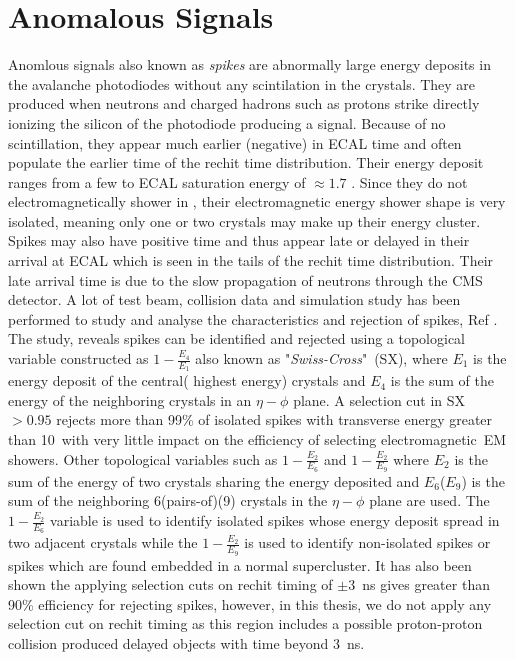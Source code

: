 \section{Anomalous Signals}
Anomlous signals also known as \textit{spikes} are abnormally large energy deposits in the avalanche photodiodes without any scintilation in the \pb crystals. They are produced when neutrons and charged hadrons such as protons strike directly ionizing the silicon of the photodiode  producing a signal.
Because of no scintillation, they appear much earlier (negative) in ECAL time and often populate the earlier time of the rechit time distribution. Their energy deposit ranges from a few \GeV to ECAL saturation energy of $\approx 1.7$ \TeV. Since they do not electromagnetically shower in \pb, their electromagnetic energy shower shape is  very isolated, meaning only one or two crystals may make up their energy cluster. Spikes may also have positive time and thus appear late or delayed in their arrival at ECAL which is seen in the tails of the rechit time distribution. Their late arrival time is due to the slow propagation of neutrons through the CMS detector. A lot of test beam, collision data and simulation study has been performed to study and analyse the characteristics and rejection of spikes, Ref \cite{spike}. The study, reveals spikes can be identified and rejected using a topological variable constructed as $1 - \frac{E_{4}}{E_{1}}$ also known as "\textit{Swiss-Cross}"~(SX), where $E_{1}$ is the energy deposit of the central( highest energy) crystals and $E_{4}$ is the sum of the energy of the neighboring crystals in an $\eta - \phi $ plane. A selection cut in SX $ > 0.95$ rejects more than 99\% of isolated spikes with transverse energy greater than 10~\GeV with very little impact on the efficiency of selecting electromagnetic~{EM} showers.
Other topological variables such as $ 1 - \frac{E_{2}}{E_{6}}$ and $ 1 - \frac{E_{2}}{E_{9}} $ where $E_{2}$ is the sum of the energy of two  crystals sharing the energy deposited and $E_{6}$($E_{9}$) is the sum of the neighboring 6(pairs-of)(9) crystals in the $\eta - \phi$ plane are used. The $ 1 - \frac{E_{2}}{E_{6}} $ variable is used to identify isolated spikes whose energy deposit spread in two adjacent crystals while the  $ 1 - \frac{E_{2}}{E_{9}} $ is used to identify  non-isolated spikes or spikes which are found embedded in a normal supercluster.
It has also been shown the applying selection cuts on rechit timing of $ \pm 3$~ns gives greater than 90\% efficiency for rejecting spikes, however, in this thesis, we do not apply any selection cut on rechit timing  as this region includes a possible proton-proton collision produced delayed objects with time beyond  $3$~ns.

